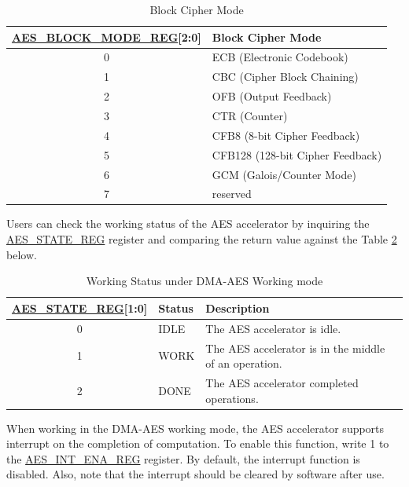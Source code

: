 \documentclass[main\_\_EN.tex]{subfiles}
\begin{document}
\begin{longtable}[c]{ | c | l | }
\caption{Block Cipher Mode}
\label{tab:aes-block-mode}
\\\hline
\rowcolor{lightgray}
\textbf{\hyperref[regdesc:AESBLOCKMODEREG]{AES\_BLOCK\_MODE\_REG}[2:0]}     & \textbf{Block Cipher Mode}\\
    \hline
    0                          & ECB (Electronic Codebook)    \\
    \hline
    1                          & CBC (Cipher Block Chaining)     \\
    \hline
    2                          & OFB (Output Feedback)    \\
    \hline
    3                          & CTR (Counter)    \\
    \hline
    4                          & CFB8 (8-bit Cipher Feedback)    \\
    \hline
    5                          & CFB128 (128-bit Cipher Feedback) \\
    \hline
    6                          & GCM (Galois/Counter Mode)     \\
    \hline
    7                         & reserved \\
    \hline
\end{longtable}

Users can check the working status of the AES accelerator by inquiring the \hyperref[regdesc:AESSTATEREG]{AES\_STATE\_REG} register and comparing the return value against the Table \ref{tab:aes-state-value-dma} below.

\begin{longtable}[c]{ | c | l | l | }
\caption{Working Status under DMA-AES Working mode}
\label{tab:aes-state-value-dma}
\\\hline
\rowcolor{lightgray}
\textbf{\hyperref[regdesc:AESSTATEREG]{AES\_STATE\_REG}[1:0]} & \textbf{Status} &  \textbf{Description} \\ \hline

    0                   & IDLE      &   The AES accelerator is idle.\\ \hline
    1                   & WORK      &   The AES accelerator is in the middle of an operation.     \\ \hline
    2                   & DONE      &   The AES accelerator completed operations.     \\ \hline
\end{longtable}

When working in the DMA-AES working mode, the AES accelerator supports interrupt on the completion of computation. To enable this function, write 1 to the \hyperref[regdesc:AESINTENAREG]{AES\_INT\_ENA\_REG} register. By default, the interrupt function is disabled. Also, note that the interrupt should be cleared by software after use.
\end{document}
